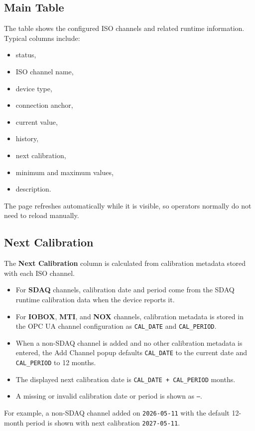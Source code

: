 \documentclass[11pt,a4paper]{article}
\begin{document}
\subsection{Main Table}
The table shows the configured ISO channels and related runtime information.
Typical columns include:

\begin{itemize}
\item status,
\item ISO channel name,
\item device type,
\item connection anchor,
\item current value,
\item history,
\item next calibration,
\item minimum and maximum values,
\item description.
\end{itemize}

The page refreshes automatically while it is visible, so operators normally do not need to reload manually.

\subsection{Next Calibration}
The \textbf{Next Calibration} column is calculated from calibration metadata stored with each ISO channel.

\begin{itemize}
\item For \textbf{SDAQ} channels, calibration date and period come from the SDAQ runtime calibration data when the device reports it.
\item For \textbf{IOBOX}, \textbf{MTI}, and \textbf{NOX} channels, calibration metadata is stored in the OPC UA channel configuration as \texttt{CAL\_DATE} and \texttt{CAL\_PERIOD}.
\item When a non-SDAQ channel is added and no other calibration metadata is entered, the Add Channel popup defaults \texttt{CAL\_DATE} to the current date and \texttt{CAL\_PERIOD} to 12 months.
\item The displayed next calibration date is \texttt{CAL\_DATE + CAL\_PERIOD} months.
\item A missing or invalid calibration date or period is shown as \texttt{---}.
\end{itemize}

For example, a non-SDAQ channel added on \texttt{2026-05-11} with the default 12-month period is shown with next calibration \texttt{2027-05-11}.
\end{document}
